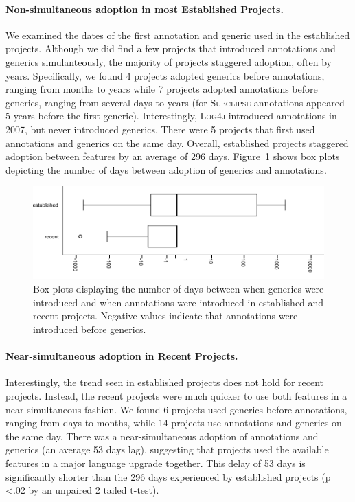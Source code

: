 \documentclass{svjour3}
\newcommand{\logfourj}{\textsc{Log4j}\xspace}
\newcommand{\subclipse}{\textsc{Subclipse}\xspace}
\begin{document}
\paragraph{Non-simultaneous adoption in most Established Projects.} We examined the dates of the first annotation and generic used in the established projects.
Although we did find a few projects that introduced annotations and generics simulanteously,
the majority of projects staggered adoption, often by years.
Specifically, we found 4 projects adopted generics before annotations, ranging from months to years  
while 7 projects adopted annotations before generics, ranging from several days to years (for \subclipse annotations appeared 5 years before the first generic). Interestingly, \logfourj introduced annotations in 2007, but never introduced generics. There were 5 projects that first used annotations and generics on the same day.
Overall, established projects staggered adoption between features by an average of 296 days.
Figure~\ref{fig:time-boxplot} shows box plots depicting the number of days between
adoption of generics and annotations.

\begin{figure}[t]
	\includegraphics[width=\textwidth]{time-boxplot.pdf}
	\caption{Box plots displaying the number of days between when generics were
	introduced and when annotations were introduced in established and recent projects.
	Negative values indicate that annotations were introduced before generics.}
	\label{fig:time-boxplot}
\end{figure}

	\paragraph{Near-simultaneous adoption in Recent Projects.} Interestingly, the trend seen in established projects does not hold for recent projects.
	Instead, the recent projects were much quicker to use both features in a near-simultaneous fashion. 
	We found 6 projects used generics before annotations, ranging from days to months, while 14 projects use annotations and generics on the same day.
There was a near-simultaneous adoption of annotations and generics (an average 53 days lag), suggesting that projects used the available features in a major language upgrade together.
This delay of 53 days is significantly shorter than the 296 days experienced by established projects (p \textless .02 by an unpaired 2 tailed t-test).
\end{document}
